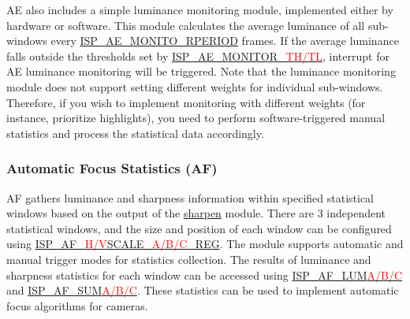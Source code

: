 \documentclass[main\_\_EN.tex]{subfiles}
\begin{document}
AE also includes a simple luminance monitoring module, implemented either by hardware or software. This module calculates the average luminance of all sub-windows every \hyperref[fielddesc:ISPAEMONITORPERIOD]{ISP\_AE\_MONITO\_RPERIOD} frames. If the average luminance falls outside the thresholds set by \hyperref[fielddesc:ISPAEMONITORTL]{ISP\_AE\_MONITOR\_\textcolor{red}{TH/TL}}, interrupt for AE luminance monitoring will be triggered. Note that the luminance monitoring module does not support setting different weights for individual sub-windows. Therefore, if you wish to implement monitoring with different weights (for instance, prioritize highlights), you need to perform software-triggered manual statistics and process the statistical data accordingly.


\subsubsection{Automatic Focus Statistics (AF)}

AF gathers luminance and sharpness information within specified statistical windows based on the output of the \hyperref[sec:isp_sharpen]{sharpen} module. There are 3 independent statistical windows, and the size and position of each window can be configured using \hyperref[regdesc:ISPAFHSCALEAREG]{ISP\_AF\_\textcolor{red}{H/V}SCALE\_\textcolor{red}{A/B/C}\_REG}. The module supports automatic and manual trigger modes for statistics collection. The results of luminance and sharpness statistics for each window can be accessed using \hyperref[fielddesc:ISPAFLUMA]{ISP\_AF\_LUM\textcolor{red}{A/B/C}} and \hyperref[fielddesc:ISPAFSUMA]{ISP\_AF\_SUM\textcolor{red}{A/B/C}}. These statistics can be used to implement automatic focus algorithms for cameras.
\end{document}
